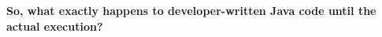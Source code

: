 \begin{flushleft}
	
	\textbf{So, what exactly happens to developer-written Java code until the actual execution?}
	
\end{flushleft}

\newpage